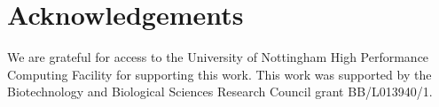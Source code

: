 \documentclass[a4paper,10pt]{article}
\begin{document}

\section*{Acknowledgements}
We are grateful for access to the University of Nottingham High Performance Computing Facility for supporting this work.
This work was supported by the Biotechnology and Biological Sciences Research Council grant BB/L013940/1.

 


\end{document}
